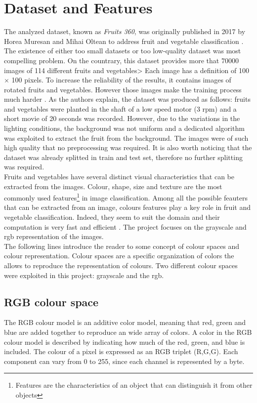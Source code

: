 \documentclass{article}
\begin{document}
\section{Dataset and Features}
The analyzed dataset, known as \textit{Fruits 360}, was originally published in 2017  by Horea Muresan and Mihai Oltean to address fruit and vegetable classification \cite{dataset}. The existence of either too small datasets or too low-quality dataset was most compelling problem.  On the countrary, this dataset provides more that 70000 images of 114 different fruits and vegetables> Each image has a definition of 100 $\times$ 100 pixels. To increase the reliability of the results, it contains images of rotated fruits and vegetables. However those images make the training process much harder .
As the authors explain, the dataset was produced as follows: fruits and vegetables were planted in the shaft of a low speed motor (3 rpm) and a short movie of 20 seconds was recorded. However, due to the variations in the lighting conditions, the background was not uniform and a dedicated algorithm was exploited to extract the fruit from the background. The images were of such high quality that no preprocessing was required.
It is also worth noticing that the dataset was already splitted in train and test set, therefore no further splitting was required.\\
Fruits and vegetables have several distinct visual characteristics that can be extracted from the images. Colour, shape, size and texture are the most commonly used features\footnote{Features are the characteristics of an object that can distinguish it from other objects} in image classification.  Among all the possible feauters that can be extracted from an image, colours features play a key role in fruit and vegetable classification. Indeed, they seem to suit the domain and their computation is very fast and efficient \cite{review}. The project focuses on the grayscale and rgb representation of the images. \\
The following lines introduce the reader to some concept of colour spaces and colour representation.
Colour spaces are a specific organization of colors the allows to  reproduce the representation of colours. Two different colour spaces were exploited in this project: grayscale and the rgb.
\subsection{RGB colour space}
The RGB colour model is an additive color model, meaning that red, green and blue are added together to reproduce an wide array of colors. A color in the RGB colour model is described by indicating how much of the red, green, and blue is included. The colour of a pixel is expressed as an RGB triplet (R,G,G). Each component can vary from 0 to 255, since each channel is represented by a byte.
\end{document}
